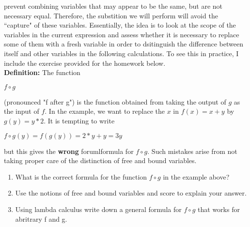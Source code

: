\documentclass{article}
\theoremstyle{theorem}
\theoremstyle{definition}
\theoremstyle{remark}
\begin{document}
prevent combining variables that may appear to be the same, but are not necessary equal. Therefore, the substition we will perform will avoid the ``capture" of these variables. Essentially, the idea is to look at the scope of the variables in the 
current expression and assess whether it is necessary to replace some of them with a fresh variable in order to dsitinguish the difference between itself and other variables in the following calculations. To see this in practice, I include the 
exercise provided for the homework below. \\


\textbf{Definition: } The function 
\begin{center}
  $f \circ g$
\end{center}
(pronounced "f after g") is the function obtained from taking the output of $g$ as the input of $f$. In the example, we want to replace the $x$ in $f(x) = x + y$ by 
$g(y) = y * 2$. It is tempting to write
\begin{center}
  $f \circ g(y) = f(g(y)) = 2 * y + y = 3y$
\end{center}
but this gives the \textbf{wrong} forumlformula for $f \circ g$. Such mistakes arise from not taking proper care of the distinction of free and bound variables. 
\begin{enumerate}
  \item What is the correct formula for the function $f \circ g$ in the example above?
  \item Use the notions of free and bound variables and score to explain your answer.
  \item Using lambda calculus write down a general formula for $f \circ g$ that works for abritrary f and g.
\end {enumerate}
\end{document}

